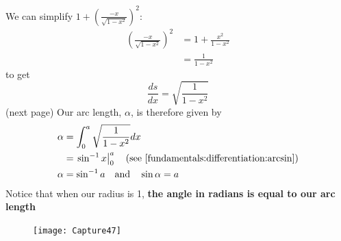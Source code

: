 \documentclass{report}
\begin{document}
We can simplify $1+\left(\frac{-x}{\sqrt{1-x^2}}\right)^2$:
\begin{align*}
\left(\frac{-x}{\sqrt{1-x^2}}\right)^2
&=1+\frac{x^2}{1-x^2}\\
&=\frac{1}{1-x^2}
\end{align*}
to get
\begin{equation*}
\frac{ds}{dx}=\sqrt{\frac{1}{1-x^2}}
\end{equation*}
(next page)
\newpage
\noindent Our arc length, $\alpha$, is therefore given by
\begin{align*}
\alpha&=\int_0^a\sqrt{\frac{1}{1-x^2}}dx\\
&=\left.\sin^{-1}x\right|_0^a\quad\text{(see \ref{fundamentals:differentiation:arcsin})}\\
\alpha&=\sin^{-1}a\quad\text{and}\quad\sin\alpha=a
\end{align*}
Notice that when our radius is 1, \textbf{the angle in radians is equal to our arc length}
\begin{figure}[h]
\texttt{[image: Capture47]}\\
\centering
{}
\end{figure}\\
\vspace{1mm}
\newpage
\end{document}
